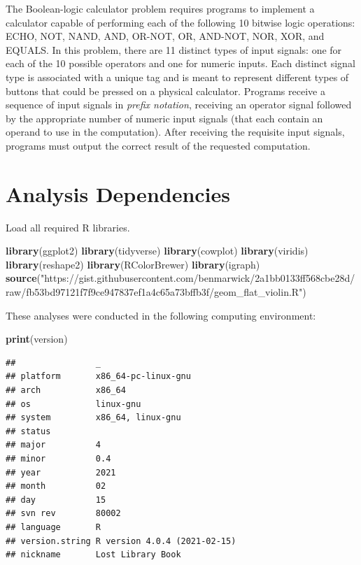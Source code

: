 \documentclass[]{book}
\newenvironment{Shaded}{\begin{snugshade}}{\end{snugshade}}
\newcommand{\KeywordTok}[1]{\textcolor[rgb]{0.13,0.29,0.53}{\textbf{#1}}}
\newcommand{\NormalTok}[1]{#1}
\newcommand{\StringTok}[1]{\textcolor[rgb]{0.31,0.60,0.02}{#1}}
\begin{document}
The Boolean-logic calculator problem requires programs to implement a calculator capable of performing each of the following 10 bitwise logic operations:
ECHO, NOT, NAND, AND, OR-NOT, OR, AND-NOT, NOR, XOR, and EQUALS.
In this problem, there are 11 distinct types of input signals: one for each of the 10 possible operators and one for numeric inputs.
Each distinct signal type is associated with a unique tag and is meant to represent different types of buttons that could be pressed on a physical calculator.
Programs receive a sequence of input signals in \emph{prefix notation}, receiving an operator signal followed by the appropriate number of numeric input signals (that each contain an operand to use in the computation).
After receiving the requisite input signals, programs must output the correct result of the requested computation.

\hypertarget{analysis-dependencies-3}{%
\section{Analysis Dependencies}\label{analysis-dependencies-3}}

Load all required R libraries.

\begin{Shaded}
\begin{Highlighting}[]
\KeywordTok{library}\NormalTok{(ggplot2)}
\KeywordTok{library}\NormalTok{(tidyverse)}
\KeywordTok{library}\NormalTok{(cowplot)}
\KeywordTok{library}\NormalTok{(viridis)}
\KeywordTok{library}\NormalTok{(reshape2)}
\KeywordTok{library}\NormalTok{(RColorBrewer)}
\KeywordTok{library}\NormalTok{(igraph)}
\KeywordTok{source}\NormalTok{(}\StringTok{"https://gist.githubusercontent.com/benmarwick/2a1bb0133ff568cbe28d/raw/fb53bd97121f7f9ce947837ef1a4c65a73bffb3f/geom_flat_violin.R"}\NormalTok{)}
\end{Highlighting}
\end{Shaded}

These analyses were conducted in the following computing environment:

\begin{Shaded}
\begin{Highlighting}[]
\KeywordTok{print}\NormalTok{(version)}
\end{Highlighting}
\end{Shaded}

\begin{verbatim}
##                _                           
## platform       x86_64-pc-linux-gnu         
## arch           x86_64                      
## os             linux-gnu                   
## system         x86_64, linux-gnu           
## status                                     
## major          4                           
## minor          0.4                         
## year           2021                        
## month          02                          
## day            15                          
## svn rev        80002                       
## language       R                           
## version.string R version 4.0.4 (2021-02-15)
## nickname       Lost Library Book
\end{verbatim}
\end{document}
